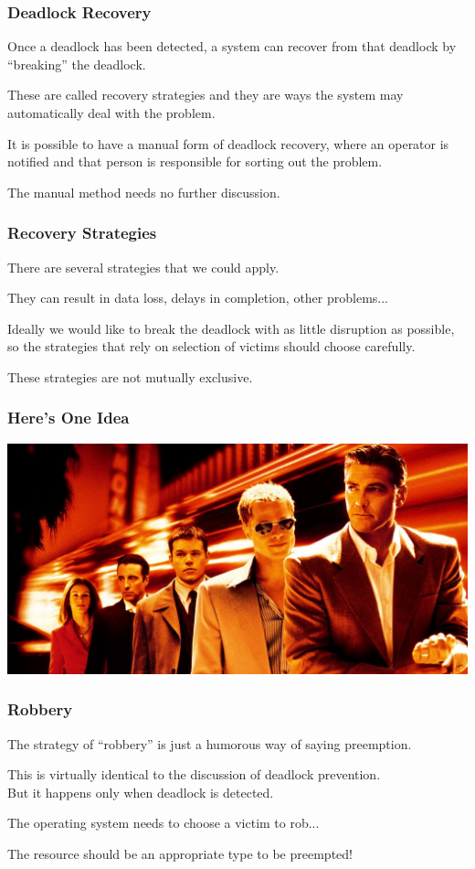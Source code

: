 \begin{frame}
	\frametitle{Deadlock Recovery}

	Once a deadlock has been detected, a system can recover from that deadlock by ``breaking'' the deadlock.

	These are called recovery strategies and they are ways the system may automatically deal with the problem.

	It is possible to have a manual form of deadlock recovery, where an operator is notified and that person is responsible for sorting out the problem.

	The manual method needs no further discussion.


\end{frame}

\begin{frame}
	\frametitle{Recovery Strategies}

	There are several strategies that we could apply.

	They can result in data loss, delays in completion, other problems...

	Ideally we would like to break the deadlock with as little disruption as possible, so the strategies that rely on selection of victims should choose carefully.

	These strategies are not mutually exclusive.

\end{frame}


\begin{frame}
	\frametitle{Here's One Idea}

	\begin{center}
		\includegraphics[width=\textwidth]{images/oceans-eleven.jpeg}
	\end{center}

\end{frame}


\begin{frame}
	\frametitle{Robbery}

	The strategy of ``robbery'' is just a humorous way of saying preemption.

	This is virtually identical to the discussion of deadlock prevention.\\
	\quad But it happens  only when deadlock is detected.

	The operating system needs to choose a victim to rob...

	The resource should be an appropriate type to be preempted!


\end{frame}

